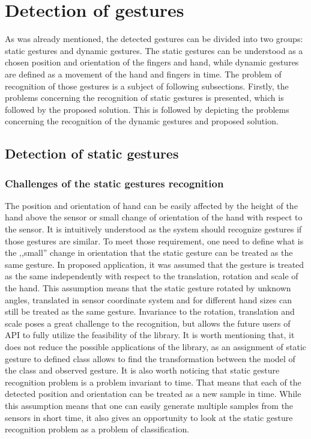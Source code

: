
\chapter{Detection of gestures}

As was already mentioned, the detected gestures can be divided into two groups: static gestures and dynamic gestures.
The static gestures can be understood as a chosen position and orientation of the fingers and hand, while dynamic gestures are defined as a movement of the hand and fingers in time. 
The problem of recognition of those gestures is a subject of following subsections. 
Firstly, the problems concerning the recognition of static gestures is presented, which is followed by the proposed solution. 
This is followed by depicting the problems concerning the recognition of the dynamic gestures and proposed solution.

\section{Detection of static gestures}

\subsection{Challenges of the static gestures recognition}

The position and orientation of hand can be easily affected by the height of the hand above the sensor or small change of orientation of the hand with respect to the sensor. 
It is intuitively understood as the system should recognize gestures if those gestures are similar.
To meet those requirement, one need to define what is the ,,small'' change in orientation that the static gesture can be treated as the same gesture.
In proposed application, it was assumed that the gesture is treated as the same independently with respect to the translation, rotation and scale of the hand. 
This assumption means that the static gesture rotated by unknown angles, translated in sensor coordinate system and for different hand sizes can still be treated as the same gesture.
Invariance to the rotation, translation and scale poses a great challenge to the recognition, but allows the future users of API to fully utilize the feasibility of the library.
It is worth mentioning that, it does not reduce the possible applications of the library, as an assignment of static gesture to defined class allows to find the transformation between the model of the class and observed gesture. 
It is also worth noticing that static gesture recognition problem is a problem invariant to time. 
That means that each of the detected position and orientation can be treated as a new sample in time.
While this assumption means that one can easily generate multiple samples from the sensors in short time, it also gives an opportunity to look at the static gesture recognition problem as a problem of classification.

